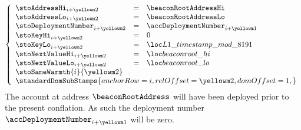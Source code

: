 \item[\underline{Storing the \inst{BEACONROOT} in the state:}] 
	\[
		\left\{ \begin{array}{lclr}
			\stoAddressHi         _{i + \roffTxSkipSysiBeaconRootSystemContractStorage} & = & \beaconRootAddressHi                        \\
			\stoAddressLo         _{i + \roffTxSkipSysiBeaconRootSystemContractStorage} & = & \beaconRootAddressLo                        \\
			\stoDeploymentNumber  _{i + \roffTxSkipSysiBeaconRootSystemContractStorage} & = & \accDeploymentNumber _{i + \roffTxSkipSysiBeaconRootSystemContractAccount} \\
			\stoKeyHi             _{i + \roffTxSkipSysiBeaconRootSystemContractStorage} & = & 0                                           \\
			\stoKeyLo             _{i + \roffTxSkipSysiBeaconRootSystemContractStorage} & = & \locLayerOneTimeStampModuloPrime            \\
			\stoNextValueHi       _{i + \roffTxSkipSysiBeaconRootSystemContractStorage} & = & \locBeaconRootHi                                               \\
			\stoNextValueLo       _{i + \roffTxSkipSysiBeaconRootSystemContractStorage} & = & \locBeaconRootLo                                               \\
			\multicolumn{3}{l}{\stoSameWarmth  {i}{\roffTxSkipSysiBeaconRootSystemContractStorage} } \\
			\multicolumn{3}{l}{
				\standardDomSubStamps {
					anchorRow = i                                              ,
					relOffset = \roffTxSkipSysiBeaconRootSystemContractStorage ,
					domOffset = 1                                              ,
				}} \\
		\end{array} \right.
	\]
	\saNote{} \label{hub: tx skip: sysi: eip 4788: deployment number of system contract}
	The account at address $\beaconRootAddress$ will have been deployed prior to the present conflation.
	As such the deployment number
	$\accDeploymentNumber _{i + \roffTxSkipSysiBeaconRootSystemContractAccount}$
	will be zero.

